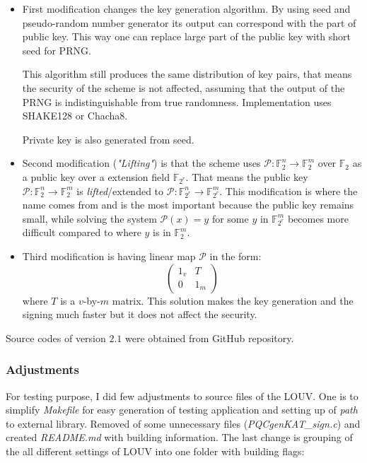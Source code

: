 \documentclass[thesis=M,english]{FITthesis}[2019/12/23]
\begin{document}
\begin{itemize}
\item	First modification changes the key generation algorithm. By using seed and pseudo-random number generator its output can correspond with the part of public key. This way one can replace large part of the public key with short seed for PRNG.

This algorithm still produces the same distribution of key pairs, that means the security of the scheme is not affected, assuming that the output of the PRNG is indistinguishable from true randomness. Implementation uses SHAKE128 or Chacha8.

Private key is also generated from seed.

\item	Second modification (\textit{"Lifting"}) is that the scheme uses $\mathcal{P}:\mathbb{F}_2^n \rightarrow \mathbb{F}_2^m$ over $\mathbb{F}_2$ as a public key over a extension field $\mathbb{F}_{2^r}$. That means the public key $\mathcal{P}:\mathbb{F}_2^n \rightarrow \mathbb{F}_2^m$ is \textit{lifted}/extended to $\mathcal{P}:\mathbb{F}_{2^r}^n \rightarrow \mathbb{F}_{2^r}^m$. This modification is where the name comes from and is the most important because the public key remains small, while solving the system $\mathcal{P}(x) = y$ for some $y$ in $\mathbb{F}_{2^r}^m$ becomes more difficult compared to where $y$ is in $\mathbb{F}_{2}^m$.\cite{L-LIFTING}

\item	Third modification is having linear map $\mathcal{P}$ in the form:
\begin{equation*}
\begin{pmatrix}
1_v & T\\
0 & 1_m
\end{pmatrix}
\end{equation*}
where $T$ is a $v$-by-$m$ matrix. This solution makes the key generation and the signing much faster\cite{L-CZYP} but it does not affect the security.\cite{L-EQ-KEYS}
\end{itemize}

Source codes of version $2.1$ were obtained from GitHub repository.

\subsubsection{Adjustments}
For testing purpose, I did few adjustments to source files of the LOUV. One is to simplify \textit{Makefile} for easy generation of testing application and setting up of \textit{path} to external library. Removed of some unnecessary files (\textit{PQCgenKAT\_sign.c}) and created \textit{README.md} with building information. The last change is grouping of the all different settings of LOUV into one folder with building flags:
\end{document}
